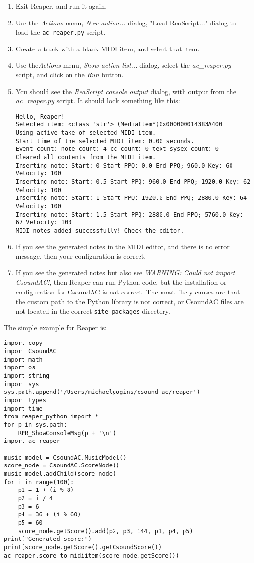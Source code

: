 \documentclass[letterpaper,10pt,DIV=12]{scrartcl}
\begin{document}
\begin{enumerate}
\item Exit Reaper, and run it again.
\item Use the \emph{Actions} menu, \emph{New action...} dialog, "Load ReaScript..." dialog to load the \lstinline|ac_reaper.py| script.
\item Create a track with a blank MIDI item, and select that item.
\item Use the\emph{Actions} menu, \emph{Show action list...} dialog, select the \emph{ac\_reaper.py} script, and click on the \emph{Run} button. 
\item You should see the \emph{ReaScript console output} dialog, with output from the \emph{ac\_reaper.py} script. It should look something like this:

\begin{lstlisting}[basicstyle=\small\ttfamily]
Hello, Reaper!
Selected item: <class 'str'> (MediaItem*)0x000000014383A400
Using active take of selected MIDI item.
Start time of the selected MIDI item: 0.00 seconds.
Event count: note_count: 4 cc_count: 0 text_sysex_count: 0
Cleared all contents from the MIDI item.
Inserting note: Start: 0 Start PPQ: 0.0 End PPQ; 960.0 Key: 60 Velocity: 100
Inserting note: Start: 0.5 Start PPQ: 960.0 End PPQ; 1920.0 Key: 62 Velocity: 100
Inserting note: Start: 1 Start PPQ: 1920.0 End PPQ; 2880.0 Key: 64 Velocity: 100
Inserting note: Start: 1.5 Start PPQ: 2880.0 End PPQ; 5760.0 Key: 67 Velocity: 100
MIDI notes added successfully! Check the editor.
\end{lstlisting}
\item If you see the generated notes in the MIDI editor, and there is no error message, then your configuration is correct.
\item If you see the generated notes but also see \emph{WARNING: Could not import CsoundAC!}, then Reaper can run Python code, but the installation or configuration for CsoundAC is not correct. The most likely causes are that the custom path to the Python library is not correct, or CsoundAC files are not located in the correct \lstinline|site-packages| directory.
\end{enumerate}

The simple example for Reaper is:

\begin{lstlisting}[basicstyle=\small\ttfamily]
import copy
import CsoundAC
import math
import os
import string
import sys
sys.path.append('/Users/michaelgogins/csound-ac/reaper')
import types
import time
from reaper_python import *
for p in sys.path:
    RPR_ShowConsoleMsg(p + '\n')
import ac_reaper

music_model = CsoundAC.MusicModel()
score_node = CsoundAC.ScoreNode()
music_model.addChild(score_node)
for i in range(100):
    p1 = 1 + (i % 8)
    p2 = i / 4
    p3 = 6
    p4 = 36 + (i % 60)
    p5 = 60
    score_node.getScore().add(p2, p3, 144, p1, p4, p5)
print("Generated score:")
print(score_node.getScore().getCsoundScore())
ac_reaper.score_to_midiitem(score_node.getScore())
\end{lstlisting}
\end{document}
